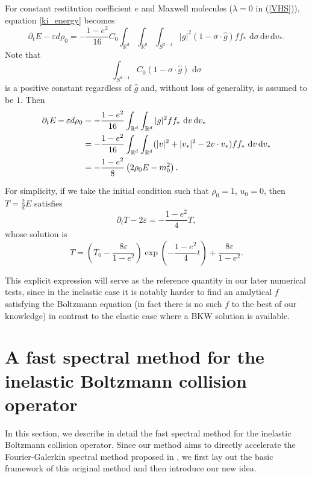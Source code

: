 \documentclass[review,times]{elsarticle}
\newcommand{\rd}{\,\mathrm{d}}
\begin{document}
For constant restitution coefficient $e$ and Maxwell molecules ($\lambda=0$ in (\ref{VHS})), equation \eqref{ki_energy} becomes
\begin{equation} 
\partial_t E -\varepsilon d\rho_0=-\frac{1-e^2}{16}C_0\int_{\mathbb{R}^d}\int_{\mathbb{R}^d}\int_{S^{d-1}}  |g|^{2}(1-\sigma\cdot \hat{g})ff_*\,\rd{\sigma}\rd{v}\rd{v_*}.
\end{equation}
Note that
\begin{equation}
\int_{S^{d-1}} C_0(1-\sigma\cdot \hat{g})\,\rd{\sigma}
\end{equation}
is a positive constant regardless of $\hat{g}$ and, without loss of generality, is assumed to be $1$. Then
\begin{align} 
  \partial_t E -\varepsilon d\rho_0 &=-\frac{1-e^2}{16}\int_{\mathbb{R}^d}\int_{\mathbb{R}^d} |g|^{2}ff_*\,\rd{v}\rd{v_*} \notag\\
   & =-\frac{1-e^2}{16}\int_{\mathbb{R}^d}\int_{\mathbb{R}^d} (|v|^2+|v_*|^2-2v\cdot v_*)ff_*\,\rd{v}\rd{v_*} \notag \\
   &=-\frac{1-e^2}{8}\left(2\rho_0E - m_0^2\right).
\end{align}

For simplicity, if we take the initial condition such that $\rho_0=1$, $u_0=0$, then $T=\frac{2}{d}E$ satisfies
\begin{equation}
\partial_t T-2\varepsilon =-\frac{1-e^2}{4}T,
\end{equation}
whose solution is
\begin{equation}\label{soln:T}
T=\left(T_0-\frac{8\varepsilon}{1-e^2}\right)\exp{\left(-\frac{1-e^2}{4}t\right)}+\frac{8\varepsilon}{1-e^2}.
\end{equation}

\begin{rmk}
This explicit expression will serve as the reference quantity in our later numerical tests, since in the inelastic case it is notably harder to find an analytical $f$ satisfying the Boltzmann equation (in fact there is no such $f$ to the best of our knowledge) in contrast to the elastic case where a BKW solution is available.
\end{rmk}


\section{A fast spectral method for the inelastic Boltzmann collision operator}

In this section, we describe in detail the fast spectral method for the inelastic Boltzmann collision operator. Since our method aims to directly accelerate the Fourier-Galerkin spectral method proposed in \cite{FPT05}, we first lay out the basic framework of this original method and then introduce our new idea.
\end{document}
